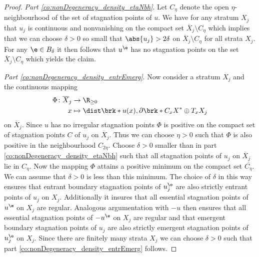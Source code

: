 \begin{proof}
  \emph{Part \ref{co:nonDegeneracy_density_etaNbh}}. 
  Let $C_\eta$ denote the open $\eta$-neighbourhood of the set of stagnation points of $u$.
  We have for any stratum $X_j$ that
  $u_j$ is continuous and nonvanishing on the compact set $\overline{X}_j\setminus C_\eta$ which implies that we can choose $\delta>0$ 
  so small that $\abs{u_j}>2\delta$ on $\overline{X}_j\setminus C_\eta$
  for all strata $X_j$.
  For any $\e\in B_\delta$ it then follows that $u^\e$ has no stagnation points on the set $\overline{X}_j\setminus C_\eta$
  which yields the claim.


  \emph{Part \ref{co:nonDegeneracy_density_entrEmerg}}.
  Now consider a stratum $X_j$ and the continuous mapping
  \begin{align*}
    \Phi\colon \overline{X}_j&\to\R_{\geq0}\\
    x&\mapsto \dist\brk*{u(x),\partial \brk*{C_xX}^*\oplus T_xX_j}
  \end{align*}
  on $\overline{X}_j$. Since $u$ has no irregular stagnation points $\Phi$ is positive on the compact set of stagnation points $C$ of $u_j$ on $\overline{X}_j$. Thus we can choose $\eta>0$
  such that $\Phi$ is also positive in the neighbourhood $C_{2\eta}$.
  Choose $\delta>0$ smaller than in part \ref{co:nonDegeneracy_density_etaNbh} such that all stagnation points of $u_j$ on $\overline{X}_j$ lie in $C_\eta$.
  Now the mapping $\Phi$ attains a positive minimum on the compact set $\overline{C_{\eta}}$.
  We can assume that $\delta>0$ is less than this minimum.
  The choice of $\delta$ in this way ensures that entrant boundary stagnation points of $u_j^\e$ are also strictly entrant points of $u_j$ on $X_j$.
  Additionally it insures that all essential stagnation points of $u^\e$ on $X_j$ are regular.
  Analogous argumentation with $-u$ then ensures that all essential stagnation points of $-u^\e$ on $X_j$ are regular and that 
  emergent boundary stagnation points of $u_j$ are also strictly emergent stagnation points of $u_j^\e$ on $X_j$.
  Since there are finitely many strata $X_j$ we can choose $\delta>0$ such that part \ref{co:nonDegeneracy_density_entrEmerg} follows.



\end{proof}

